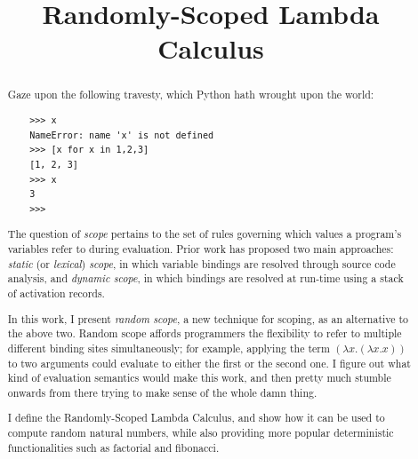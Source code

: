 \documentclass[10pt]{sigplanconf}
\begin{document}
\copyrightdata{}


\title{
Randomly-Scoped Lambda Calculus
}



\maketitle

\begin{abstract}

Gaze upon the following travesty, which Python hath wrought upon the world:
\begin{verbatim}
    >>> x
    NameError: name 'x' is not defined
    >>> [x for x in 1,2,3]
    [1, 2, 3]
    >>> x
    3
    >>>
\end{verbatim}

The question of {\em scope} pertains to the set of rules governing which values a program's variables refer to during evaluation.
Prior work has proposed two main approaches: {\em static} (or {\em lexical}) {\em scope}, in which variable bindings are resolved through source code analysis, and {\em dynamic scope}, in which bindings are resolved at run-time using a stack of activation records.

In this work, I present {\em random scope}, a new technique for scoping, as an alternative to the above two.
Random scope affords programmers the flexibility to refer to multiple different binding sites simultaneously; for example, applying the term $(\lambda x. (\lambda x. x))$ to two arguments could evaluate to either the first or the second one.
I figure out what kind of evaluation semantics would make this work, and then pretty much stumble onwards from there trying to make sense of the whole damn thing.

I define the Randomly-Scoped Lambda Calculus, and show how it can be used to compute random natural numbers, while also providing more popular deterministic functionalities such as factorial and fibonacci.

\end{abstract}
\end{document}
